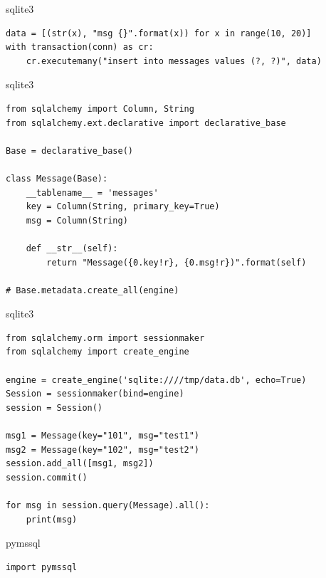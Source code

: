 \documentclass{article}
\begin{document}
\begin{center} sqlite3 \end{center}
\begin{lstlisting}
data = [(str(x), "msg {}".format(x)) for x in range(10, 20)]
with transaction(conn) as cr:
    cr.executemany("insert into messages values (?, ?)", data)
\end{lstlisting}
\newpage

\begin{center} sqlite3 \end{center}
\begin{lstlisting}
from sqlalchemy import Column, String
from sqlalchemy.ext.declarative import declarative_base

Base = declarative_base()

class Message(Base):
    __tablename__ = 'messages'
    key = Column(String, primary_key=True)
    msg = Column(String)

    def __str__(self):
        return "Message({0.key!r}, {0.msg!r})".format(self)

# Base.metadata.create_all(engine)
\end{lstlisting}
\newpage


\begin{center} sqlite3 \end{center}
\begin{lstlisting}
from sqlalchemy.orm import sessionmaker
from sqlalchemy import create_engine

engine = create_engine('sqlite:////tmp/data.db', echo=True)
Session = sessionmaker(bind=engine)
session = Session()

msg1 = Message(key="101", msg="test1")
msg2 = Message(key="102", msg="test2")
session.add_all([msg1, msg2])
session.commit()

for msg in session.query(Message).all():
    print(msg) 
\end{lstlisting}
\newpage

\begin{center} pymssql \end{center}
\begin{lstlisting}
import pymssql
\end{lstlisting}
\newpage
\end{document}
